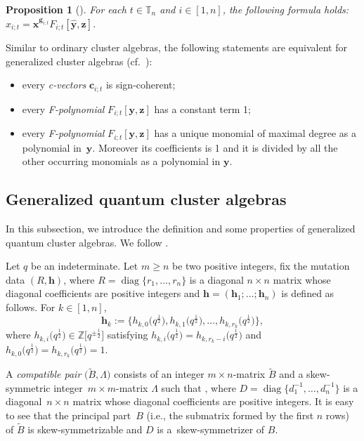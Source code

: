 \documentclass[10pt,a4paper]{amsart}
\numberwithin{equation}{section}
\newtheorem{Proposition}[Theorem]{Proposition}
 { \theoremstyle{definition}
\newtheorem{Definition}[Theorem]{Definition}
\newtheorem{Note}[Theorem]{Note}
\newtheorem{Example}[Theorem]{Example}
\newtheorem{Remark}[Theorem]{Remark} }
\begin{document}
\begin{Proposition}[{\cite[Theorem 3.23]{Nakanishi14}}]\label{p:separation-formula-gca}
 For each $t\in \mathbb{T}_n$ and $i\in[1,n]$, the following formula holds:
 $
 x_{i;t}=\mathbf{x}^{\mathbf{g}_{i;t}}F_{i;t}[\hat{\mathbf{y}},\mathbf{z}]$.
\end{Proposition}
\begin{Remark}
 Similar to ordinary cluster algebras, the following statements are equivalent for generalized cluster algebras (cf.\ \cite[Proposition 3.19]{Nakanishi14}):
 \begin{itemize}\itemsep=0pt
 \item every {\it c-vectors} $\mathbf{c}_{i;t}$ is sign-coherent;
 \item every {\it F-polynomial} $F_{i;t}[\mathbf{y},\mathbf{z}]$ has a constant term 1;
 \item every {\it F-polynomial} $F_{i;t}[\mathbf{y},\mathbf{z}]$ has a unique monomial of maximal degree as a polynomial in~$\mathbf{y}$. Moreover its coefficients is 1 and it is divided by all the other occurring monomials as a polynomial in $\mathbf{y}$.
\end{itemize}
\end{Remark}

\subsection{Generalized quantum cluster algebras}\label{ss:gqca}
In this subsection, we introduce the definition and some properties of generalized quantum cluster algebras. We follow \cite{BCDX2018}.

Let $q$ be an indeterminate. Let $m\ge n$ be two positive integers, fix the mutation data $(R,\mathbf{h})$, where $R=\operatorname{diag}\{r_1,\dots,r_n\}$ is a diagonal $n\times n$ matrix whose diagonal coefficients are positive integers and $\mathbf{h}=(\mathbf{h}_1;\dots;\mathbf{h}_n)$ is defined as follows.
For $k\in[1,n]$,
\[
\mathbf{h}_{k}:=\bigl\{h_{k,0}\bigl(q^{\frac{1}{2}}\bigr),h_{k,1}\bigl(q^{\frac{1}{2}}\bigr),\dots,h_{k,r_{k}}\bigl(q^{\frac{1}{2}}\bigr)\bigr\},
\]
where $h_{k,i}\bigl(q^{\frac{1}{2}}\bigr)\in\mathbb{Z}\big[q^{\pm\frac{1}{2}}\big]$ satisfying $h_{k,i}\bigl(q^{\frac{1}{2}}\bigr)=h_{k,r_{k}-i}\bigl(q^{\frac{1}{2}}\bigr)$
and $h_{k,0}\bigl(q^{\frac{1}{2}}\bigr)=h_{k,r_{k}}\bigl(q^{\frac{1}{2}}\bigr)=1$.

A {\it compatible pair} $\bigl(\tilde{B}, \Lambda\bigr)$ consists of an integer $m\times n$-matrix $\tilde{B}$ and a skew-symmetric integer~${m\times m}$-matrix $\Lambda$ such that
,
where $D=\operatorname{diag}\bigl\{d_1^{-1},\dots, d_n^{-1}\bigr\}$ is a diagonal~${n\times n}$ matrix whose diagonal coefficients are positive integers. It is easy to see that the principal part~$B$ (i.e., the submatrix formed by the first $n$ rows) of $\tilde{B}$ is skew-symmetrizable and $D$ is a~skew-symmetrizer of $B$.
\end{document}
